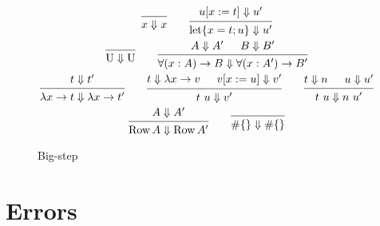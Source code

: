 \begin{figure}
  \begin{gather*}
    \begin{prooftree}
      \infer0{x \Downarrow x}
    \end{prooftree}
    \qquad
    \begin{prooftree}
      \hypo{u[x := t] \Downarrow u'}
      \infer1{\Let \{ x = t; u \} \Downarrow u'}
    \end{prooftree}
    \\
    \begin{prooftree}
      \infer0{\Univ \Downarrow \Univ}
    \end{prooftree}
    \qquad
    \begin{prooftree}
      \hypo{A \Downarrow A'}
      \hypo{B \Downarrow B'}
      \infer2{\forall (x : A) \to B \Downarrow \forall (x : A') \to B'}
    \end{prooftree}
    \\
    \begin{prooftree}
      \hypo{t \Downarrow t'}
      \infer1{\lambda x \to t \Downarrow \lambda x \to t'}
    \end{prooftree}
    \qquad
    \begin{prooftree}
      \hypo{t \Downarrow \lambda x \to v}
      \hypo{v[x := u] \Downarrow v'}
      \infer2{t\ u \Downarrow v'}
    \end{prooftree}
    \qquad
    \begin{prooftree}
      \hypo{t \Downarrow n}
      \hypo{u \Downarrow u'}
      \infer2{t\ u \Downarrow n\ u'}
    \end{prooftree}
    \\
    \begin{prooftree}
      \hypo{A \Downarrow A'}
      \infer1{\RowType A \Downarrow \RowType A'}
    \end{prooftree}
    \qquad
    \begin{prooftree}
      \infer0{\# \{ \} \Downarrow \# \{ \}}
    \end{prooftree}
  \end{gather*}
  \caption{Big-step}\label{fig:big-step}
\end{figure}

\section{Errors}
